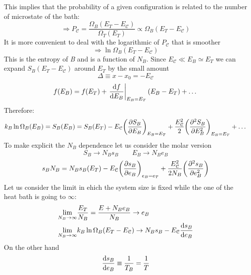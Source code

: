 \documentclass[../main/main.tex]{subfiles}
\begin{document}
This implies that the probability of a given configuration is related to the number of microstate of the bath:
\begin{equation}
  \Rightarrow   P_{\mathcal{C} }= \frac{\Omega _B (E_T - E_{\mathcal{C} })}{\Omega _T (E_T)} \propto \Omega _B (E_T - E_{\mathcal{C} })
\end{equation}
It is more convenient to deal with the logarithmic of \( P_{\mathcal{C} } \) that is smoother
\begin{equation}
  \Rightarrow  \ln{\Omega _B (E_T - E_{\mathcal{C} })}
\end{equation}
This is the entropy of \emph{B} and is a function of \( N_B \). Since \( E_{\mathcal{C}} \ll E_B \simeq E_T \) we can expand \( S_B (E_T - E_{\mathcal{C} }) \) around \( E_T \) by the small amount
\begin{equation}
  \Delta \equiv x-x_0 = - E_{\mathcal{C} }
\end{equation}
\begin{equation}
  f(E_B) = f(E_T) +  \eval{\dv{f}{E_B}}_{E_B = E_T} (E_B-E_T) + \dots
\end{equation}
Therefore:
\begin{equation}
  k_B \ln{\Omega _B (E_B) } = S_B (E_B) = S_B (E_T) - E_{\mathcal{C} } \qty(\pdv{S_B}{E_B} )_{E_B = E_T} + \frac{E^2_{\mathcal{C} }}{2} \qty( \pdv[2]{S_B}{E_B} )_{E_B =E_T} + \dots
\end{equation}
To make explicit the \( N_B \) dependence let us consider the molar version
\begin{equation}
  S_B \rightarrow N_B s_B \qquad
  E_B \rightarrow N_B e_B
\end{equation}
\begin{equation}
  s_B N_B = N_B s_B (E_T) - E_{\mathcal{C}} \qty(\pdv{s_B}{e_B} )_{e_B=e_T} + \frac{E_{\mathcal{C}}^2}{2 N_B}  \qty(\pdv[2]{s_B}{e_B} )
\end{equation}
Let us consider the limit in ehich the system size is fixed while the one of the heat bath is going to \( \infty  \):
\begin{subequations}
\begin{align}
  \lim_{N_B \rightarrow \infty } & \frac{E_T}{N_B} = \frac{E+N_B e_B}{N_B} \rightarrow e_B \\
  \lim_{N_B \rightarrow \infty } & k_B \ln{\Omega _B (E_T - E_{\mathcal{C}})} \rightarrow N_B s_B - E_{\mathcal{C}} \dv{s_B}{e_B}
\end{align}
\end{subequations}
On the other hand
\begin{equation}
  \dv{s_B}{e_B} \equiv \frac{1}{T_B} = \frac{1}{T}
\end{equation}
\end{document}
